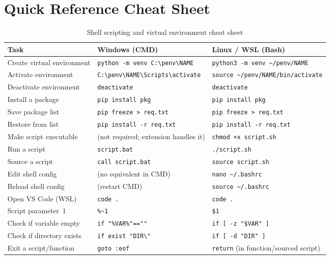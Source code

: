 \section{Quick Reference Cheat Sheet}
\label{sec:cheatsheet}

\begin{table}[h]
\centering
\caption{Shell scripting and virtual environment cheat sheet}
\label{tab:cheatsheet}
\begin{tabular}{@{}p{}p{}p{}@{}}
\toprule
\textbf{Task} & \textbf{Windows (CMD)} & \textbf{Linux / WSL (Bash)} \\
\midrule
Create virtual environment
  & \texttt{python -m venv C:\textbackslash penv\textbackslash NAME}
  & \texttt{python3 -m venv \textasciitilde/penv/NAME} \\[4pt]
Activate environment
  & \texttt{C:\textbackslash penv\textbackslash NAME\textbackslash Scripts\textbackslash activate}
  & \texttt{source \textasciitilde/penv/NAME/bin/activate} \\[4pt]
Deactivate environment
  & \texttt{deactivate}
  & \texttt{deactivate} \\[4pt]
Install a package
  & \texttt{pip install pkg}
  & \texttt{pip install pkg} \\[4pt]
Save package list
  & \texttt{pip freeze > req.txt}
  & \texttt{pip freeze > req.txt} \\[4pt]
Restore from list
  & \texttt{pip install -r req.txt}
  & \texttt{pip install -r req.txt} \\[4pt]
Make script executable
  & (not required; extension handles it)
  & \texttt{chmod +x script.sh} \\[4pt]
Run a script
  & \texttt{script.bat}
  & \texttt{./script.sh} \\[4pt]
Source a script
  & \texttt{call script.bat}
  & \texttt{source script.sh} \\[4pt]
Edit shell config
  & (no equivalent in CMD)
  & \texttt{nano \textasciitilde/.bashrc} \\[4pt]
Reload shell config
  & (restart CMD)
  & \texttt{source \textasciitilde/.bashrc} \\[4pt]
Open VS Code (WSL)
  & \texttt{code .}
  & \texttt{code .} \\[4pt]
Script parameter~1
  & \texttt{\%\textasciitilde1}
  & \texttt{\$1} \\[4pt]
Check if variable empty
  & \texttt{if "\%VAR\%"==""}
  & \texttt{if [ -z "\$VAR" ]} \\[4pt]
Check if directory exists
  & \texttt{if exist "DIR\textbackslash"}
  & \texttt{if [ -d "DIR" ]} \\[4pt]
Exit a script/function
  & \texttt{goto :eof}
  & \texttt{return} (in function/sourced script) \\
\bottomrule
\end{tabular}
\end{table}

